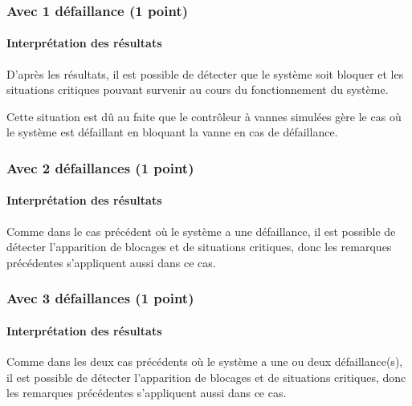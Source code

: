 \documentclass[a4paper]{book}
\begin{document}
\subsubsection{Avec 1 défaillance (1 point)}





\paragraph{Interprétation des résultats}
D'après les résultats, il est possible de détecter que le système soit bloquer et les situations critiques pouvant survenir au cours du fonctionnement du système.

Cette situation est dû au faite que le contrôleur à vannes simulées gère le cas où le système est défaillant en bloquant la vanne en cas de défaillance.


\subsubsection{Avec 2 défaillances (1 point)}





\paragraph{Interprétation des résultats}
Comme dans le cas précédent où le système a une défaillance, il est possible de détecter l'apparition de blocages et de situations critiques, donc les remarques précédentes s'appliquent aussi dans ce cas.
\subsubsection{Avec 3 défaillances (1 point)}





\paragraph{Interprétation des résultats}
Comme dans les deux cas précédents où le système a une ou deux défaillance(s), il est possible de détecter l'apparition de blocages et de situations critiques, donc les remarques précédentes s'appliquent aussi dans ce cas.
\end{document}
